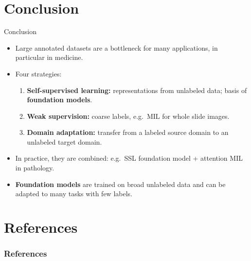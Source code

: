 \documentclass[xcolor=pdftex,dvipsnames,table]{beamer}
\begin{document}
\section{Conclusion}

\begin{frame}{Conclusion}
\begin{itemize}
\item Large annotated datasets are a bottleneck for many applications, in particular in medicine.
\item Four strategies:
\begin{enumerate}
   \item \textbf{Self-supervised learning:} representations from unlabeled data; basis of \textbf{foundation models}.
   \item \textbf{Weak supervision:} coarse labels, e.g.\ MIL for whole slide images.
   \item \textbf{Domain adaptation:} transfer from a labeled source domain to an unlabeled target domain.
\end{enumerate}
\item In practice, they are combined: e.g.\ SSL foundation model + attention MIL in pathology.
\item \textbf{Foundation models} are trained on broad unlabeled data and can be adapted to many tasks with few labels.
\end{itemize}
\end{frame}


\section{References}
\begin{frame}[allowframebreaks]
	\frametitle{References}
	
\end{frame}
\end{document}
